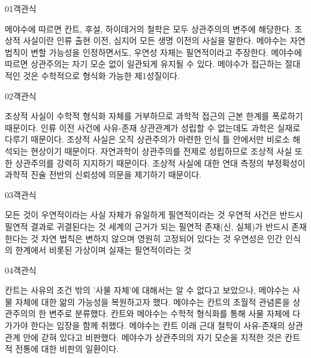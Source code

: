 \documentclass[fs85,seriesWit]{korfarm-base}
\begin{document}
\kfBeginMC
\begin{kfQBlock}{01}{객관식}
\begin{kfChoices}
\kfChoice 메야수에 따르면 칸트, 후설, 하이데거의 철학은 모두 상관주의의 변주에 해당한다.
\kfChoice 조상적 사실이란 인류 출현 이전, 심지어 모든 생명 이전의 사실을 말한다.
\kfChoice 메야수는 자연 법칙이 변할 가능성을 인정하면서도, 우연성 자체는 필연적이라고 주장한다.
\kfChoice 메야수에 따르면 상관주의는 자기 모순 없이 일관되게 유지될 수 있다.
\kfChoice 메야수가 접근하는 절대적인 것은 수학적으로 형식화 가능한 제1성질이다.
\end{kfChoices}
\end{kfQBlock}

\begin{kfQBlock}{02}{객관식}
\begin{kfChoices}
\kfChoice 조상적 사실이 수학적 형식화 자체를 거부하므로 과학적 접근의 근본 한계를 폭로하기 때문이다.
\kfChoice 인류 이전 사건에 사유-존재 상관관계가 성립할 수 없는데도 과학은 실재로 다루기 때문이다.
\kfChoice 조상적 사실은 오직 상관주의가 마련한 인식 틀 안에서만 비로소 해석되는 현상이기 때문이다.
\kfChoice 자연과학이 상관주의를 전제로 성립하므로 조상적 사실 또한 상관주의를 강력히 지지하기 때문이다.
\kfChoice 조상적 사실에 대한 연대 측정의 부정확성이 과학적 진술 전반의 신뢰성에 의문을 제기하기 때문이다.
\end{kfChoices}
\end{kfQBlock}

\begin{kfQBlock}{03}{객관식}
\begin{kfChoices}
\kfChoice 모든 것이 우연적이라는 사실 자체가 유일하게 필연적이라는 것
\kfChoice 우연적 사건은 반드시 필연적 결과로 귀결된다는 것
\kfChoice 세계의 근거가 되는 필연적 존재(신, 실체)가 반드시 존재한다는 것
\kfChoice 자연 법칙은 변하지 않으며 영원히 고정되어 있다는 것
\kfChoice 우연성은 인간 인식의 한계에서 비롯된 가상이며 실재는 필연적이라는 것
\end{kfChoices}
\end{kfQBlock}

\begin{kfQBlock}{04}{객관식}
\begin{kfChoices}
\kfChoice 칸트는 사유의 조건 밖의 '사물 자체'에 대해서는 알 수 없다고 보았으나, 메야수는 사물 자체에 대한 앎의 가능성을 복원하고자 했다.
\kfChoice 메야수는 칸트의 초월적 관념론을 상관주의의 한 변주로 분류했다.
\kfChoice 칸트와 메야수는 수학적 형식화를 통해 사물 자체에 다가가야 한다는 입장을 함께 취했다.
\kfChoice 메야수는 칸트 이래 근대 철학이 사유-존재의 상관관계 안에 갇혀 있다고 비판했다.
\kfChoice 메야수가 상관주의의 자기 모순을 지적한 것은 칸트적 전통에 대한 비판의 일환이다.
\end{kfChoices}
\end{kfQBlock}
\end{document}
